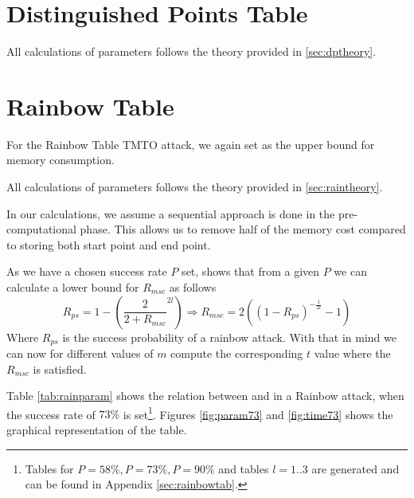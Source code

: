 \section{Distinguished Points Table}

All calculations of parameters follows the theory provided in \ref{sec:dptheory}.

\section{Rainbow Table}
For the Rainbow Table TMTO attack, we again set  as the
upper bound for memory consumption. 

All calculations of parameters follows the theory provided in
\ref{sec:raintheory}. 

In our calculations, we assume a sequential approach is done in the
pre-computational phase. This allows us to remove half of the memory
cost compared to storing both start point and end point.

As we have a chosen success rate $P$ set, \cite[Proposition
29]{176} shows that from a given $P$ we can calculate a lower bound
for $R_{msc}$ as follows
\[R_{ps} = 1 - \left( \frac{2}{2 + R_{msc}}^{2l} \right) \Rightarrow R_{msc} = 2 ((1 - R_{ps})^{-\frac{1}{2l}} - 1)\] 
Where $R_{ps}$ is the success probability of a rainbow attack. With
that in mind we can now for different values of $m$ compute the
corresponding $t$ value where the $R_{msc}$ is satisfied. 

Table \ref{tab:rainparam} shows the relation between  and
 in a Rainbow attack, when the success rate of $73\%$ is set\footnote{Tables for $P = 58\%, P = 73\%, P = 90\%$ and tables $l=1..3$ are generated and can be
found in Appendix \ref{sec:rainbowtab}.}. Figures \ref{fig:param73}
and \ref{fig:time73} shows the graphical representation of the table.

